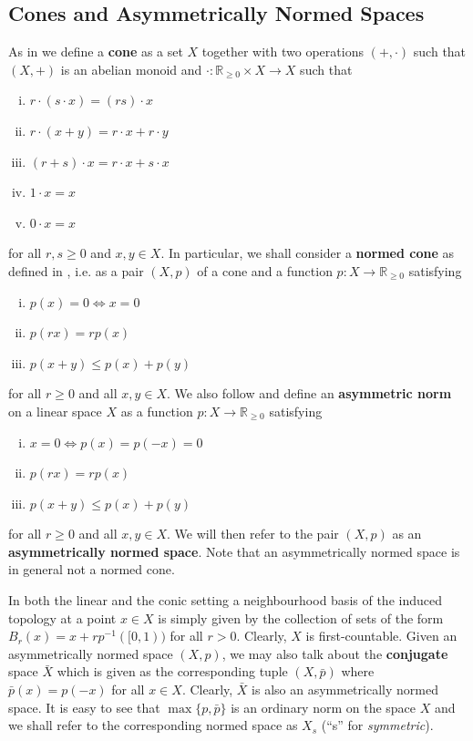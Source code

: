 \documentclass[
	paper=A4,
	pagesize=auto,
	fontsize=12pt
]{scrartcl}
\theoremstyle{plain}
\theoremstyle{remark}
\theoremstyle{definition}
\begin{document}
\subsection{Cones and Asymmetrically Normed Spaces}
As in \cite{src:Valero:QuotientNormedSpace} we define a \textbf{cone} as a set $X$ together with two operations $(+,\cdot)$ such that $(X,+)$ is an abelian monoid and $\cdot : \mathbb{R}_{\ge 0} \times X \to X$ such that
%
\begin{enumerate}[(i)]
\item $r \cdot \left( s \cdot x \right) = \left( r s \right) \cdot x$
\item $r \cdot \left( x + y \right) = r \cdot x + r \cdot y$
\item $\left( r + s \right) \cdot x = r \cdot x + s \cdot x$
\item $1 \cdot x = x$
\item $0 \cdot x = x$
\end{enumerate}
%
for all $r, s \ge 0$ and $x, y \in X$.
In particular, we shall consider a \textbf{normed cone} as defined in \cite{src:Valero:QuotientNormedSpace}, i.e. as a pair $(X, p)$ of a cone and a function $p : X \to \mathbb{R}_{\ge 0}$ satisfying
%
\begin{enumerate}[(i)]
\item $p \left( x \right) = 0 \iff x = 0$
\item $p \left( r x \right) = r p \left( x \right)$
\item $p \left( x + y \right) \le p \left( x \right) + p \left( y \right)$
\end{enumerate}
%
for all $r \ge 0$ and all $x, y \in X$.
We also follow \cite{src:Cobzaş:FunctionalAnalysisinAsymmetricNormedSpaces} and define an \textbf{asymmetric norm} on a linear space $X$ as a function $p : X \to \mathbb{R}_{\ge 0}$ satisfying
%
\begin{enumerate}[(i)]
	\item $x = 0 \iff p \left( x \right) = p \left( -x \right) = 0$
	\item $p \left( r x \right) = r p \left( x \right)$
	\item $p \left( x + y \right) \le p \left( x \right) + p \left( y \right)$
\end{enumerate}
%
for all $r \ge 0$ and all $x, y \in X$.
We will then refer to the pair $(X,p)$ as an \textbf{asymmetrically normed space}.
Note that an asymmetrically normed space is in general not a normed cone.

In both the linear and the conic setting a neighbourhood basis of the induced topology at a point $x \in X$ is simply given by the collection of sets of the form $B_r(x) = x + r p^{-1}([0,1))$ for all $r > 0$.
Clearly, $X$ is first-countable.
Given an asymmetrically normed space $(X, p)$, we may also talk about the \textbf{conjugate} space $\bar{X}$ which is given as the corresponding tuple $(X, \bar{p})$ where $\bar{p}(x) = p(-x)$ for all $x \in X$.
Clearly, $\bar{X}$ is also an asymmetrically normed space.
It is easy to see that $\max\{p, \bar{p}\}$ is an ordinary norm on the space $X$ and we shall refer to the corresponding normed space as $X_s$ (\enquote{s} for \emph{symmetric}).
\end{document}
